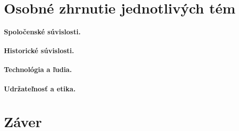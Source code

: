 \documentclass[10pt,oneside,slovak,a4paper]{article}
\begin{document}
\section{Osobné zhrnutie jednotlivých tém} \label{zaver} 
\paragraph{Spoločenské súvislosti.}
 \paragraph{Historické súvislosti.}
 \paragraph{Technológia a ľudia.}
\paragraph{Udržateľnosť a etika.}

\section{Záver} \label{zaver} 



\end{document}
